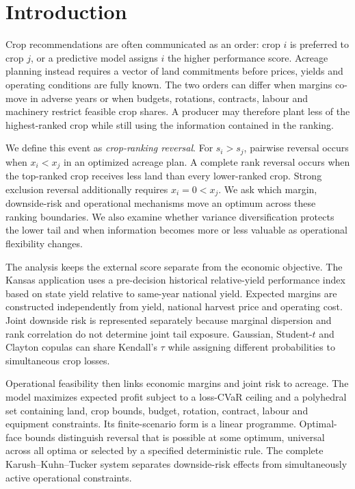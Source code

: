 \section{Introduction}

Crop recommendations are often communicated as an order: crop \(i\) is
preferred to crop \(j\), or a predictive model assigns \(i\) the higher
performance score. Acreage planning instead requires a vector of land
commitments before prices, yields and operating conditions are fully known.
The two orders can differ when margins co-move in adverse years or when
budgets, rotations, contracts, labour and machinery restrict feasible crop
shares. A producer may therefore plant less of the highest-ranked crop while
still using the information contained in the ranking.

We define this event as \emph{crop-ranking reversal}. For \(s_i>s_j\),
pairwise reversal occurs when \(x_i<x_j\) in an optimized acreage plan. A
complete rank reversal occurs when the top-ranked crop receives less land than
every lower-ranked crop. Strong exclusion reversal additionally requires
\(x_i=0<x_j\). We ask which margin, downside-risk and operational mechanisms
move an optimum across these ranking boundaries. We also examine whether
variance diversification protects the lower tail and when information becomes
more or less valuable as operational flexibility changes.

The analysis keeps the external score separate from the economic objective.
The Kansas application uses a pre-decision historical relative-yield
performance index based on state yield relative to same-year national yield.
Expected margins are constructed independently from yield, national harvest
price and operating cost. Joint downside risk is represented separately
because marginal dispersion and rank correlation do not determine joint tail
exposure. Gaussian, Student-\(t\) and Clayton copulas can share Kendall's
\(\tau\) while assigning different probabilities to simultaneous crop losses.

Operational feasibility then links economic margins and joint risk to acreage.
The model maximizes expected profit subject to a loss-CVaR ceiling and a
polyhedral set containing land, crop bounds, budget, rotation, contract,
labour and equipment constraints. Its finite-scenario form is a linear
programme. Optimal-face bounds distinguish reversal that is possible at some
optimum, universal across all optima or selected by a specified deterministic
rule. The complete Karush--Kuhn--Tucker system separates downside-risk effects
from simultaneously active operational constraints.

